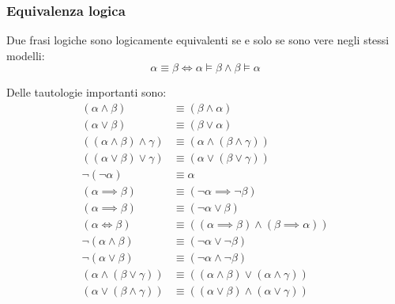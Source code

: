 \documentclass[a4paper]{article}
\begin{document}
\subsubsection{Equivalenza logica}
Due frasi logiche sono logicamente equivalenti se e solo se sono vere negli stessi
modelli:
\[
  \alpha \equiv \beta \iff \alpha \models \beta \wedge \beta \models \alpha
\] 
\begin{example}
  Delle tautologie importanti sono:
  \begin{equation}
    \begin{aligned}
      \left( \alpha \wedge \beta \right) & \equiv \left( \beta \wedge \alpha \right)\\
      \left( \alpha \vee \beta \right) & \equiv \left( \beta \vee \alpha \right)\\
      \left( \left( \alpha \wedge \beta \right) \wedge \gamma \right) & \equiv
        \left( \alpha \wedge \left( \beta \wedge \gamma \right) \right)\\
      \left( \left( \alpha \vee \beta \right) \vee \gamma \right) & \equiv
        \left( \alpha \vee \left( \beta \vee \gamma \right) \right)\\
      \neg \left( \neg \alpha \right) & \equiv \alpha \\
      \left( \alpha \implies \beta \right) & \equiv \left( \neg \alpha \implies \neg \beta \right) \\
      \left( \alpha \implies \beta \right) & \equiv \left( \neg \alpha \vee \beta \right) \\
      \left( \alpha \iff \beta \right) & \equiv \left( \left( \alpha \implies \beta \right) \wedge
      \left( \beta \implies \alpha \right) \right) \\
      \neg \left( \alpha \wedge \beta \right) & \equiv \left( \neg \alpha \vee \neg \beta \right) \\
      \neg \left( \alpha \vee \beta \right) & \equiv \left( \neg \alpha \wedge \neg \beta \right) \\
      \left( \alpha \wedge \left( \beta \vee \gamma  \right)  \right) & \equiv
        \left( \left( \alpha \wedge \beta \right) \vee \left( \alpha \wedge \gamma \right) \right)\\
      \left( \alpha \vee \left( \beta \wedge \gamma  \right)  \right) & \equiv
        \left( \left( \alpha \vee \beta \right) \wedge \left( \alpha \vee \gamma \right) \right)
    \end{aligned}
  \end{equation}
\end{example}
\end{document}
